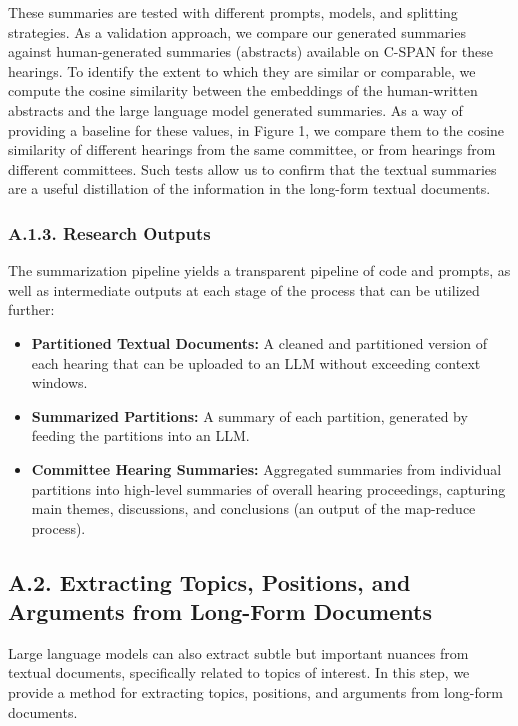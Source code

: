 \documentclass[11pt]{article}
\begin{document}
These summaries are tested with different prompts, models, and splitting strategies. As a validation approach, we compare our generated summaries against human-generated summaries (abstracts) available on C-SPAN for these hearings. To identify the extent to which they are similar or comparable, we compute the cosine similarity between the embeddings of the human-written abstracts and the large language model generated summaries. As a way of providing a baseline for these values, in Figure 1, we compare them to the cosine similarity of different hearings from the same committee, or from hearings from different committees. Such tests allow us to confirm that the textual summaries are a useful distillation of the information in the long-form textual documents.

\subsubsection*{A.1.3. Research Outputs}

The summarization pipeline yields a transparent pipeline of code and prompts, as well as intermediate outputs at each stage of the process that can be utilized further:

\begin{itemize}
    \item \textbf{Partitioned Textual Documents:} A cleaned and partitioned version of each hearing that can be uploaded to an LLM without exceeding context windows.
    \item \textbf{Summarized Partitions:} A summary of each partition, generated by feeding the partitions into an LLM.
    \item \textbf{Committee Hearing Summaries:} Aggregated summaries from individual partitions into high-level summaries of overall hearing proceedings, capturing main themes, discussions, and conclusions (an output of the map-reduce process).
\end{itemize}

\subsection*{A.2. Extracting Topics, Positions, and Arguments from Long-Form Documents}

Large language models can also extract subtle but important nuances from textual documents, specifically related to topics of interest. In this step, we provide a method for extracting topics, positions, and arguments from long-form documents.
\end{document}
